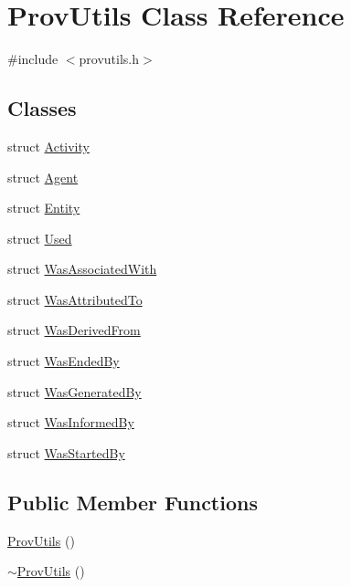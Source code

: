 \hypertarget{class_prov_utils}{\section{Prov\-Utils Class Reference}
\label{class_prov_utils}
}


{\ttfamily \#include $<$provutils.\-h$>$}

\subsection*{Classes}
\begin{DoxyCompactItemize}
\item 
struct \hyperlink{struct_prov_utils_1_1_activity}{Activity}
\item 
struct \hyperlink{struct_prov_utils_1_1_agent}{Agent}
\item 
struct \hyperlink{struct_prov_utils_1_1_entity}{Entity}
\item 
struct \hyperlink{struct_prov_utils_1_1_used}{Used}
\item 
struct \hyperlink{struct_prov_utils_1_1_was_associated_with}{Was\-Associated\-With}
\item 
struct \hyperlink{struct_prov_utils_1_1_was_attributed_to}{Was\-Attributed\-To}
\item 
struct \hyperlink{struct_prov_utils_1_1_was_derived_from}{Was\-Derived\-From}
\item 
struct \hyperlink{struct_prov_utils_1_1_was_ended_by}{Was\-Ended\-By}
\item 
struct \hyperlink{struct_prov_utils_1_1_was_generated_by}{Was\-Generated\-By}
\item 
struct \hyperlink{struct_prov_utils_1_1_was_informed_by}{Was\-Informed\-By}
\item 
struct \hyperlink{struct_prov_utils_1_1_was_started_by}{Was\-Started\-By}
\end{DoxyCompactItemize}
\subsection*{Public Member Functions}
\begin{DoxyCompactItemize}
\item 
\hyperlink{class_prov_utils_a1c050ce900080f4b2bf9731b7799c025}{Prov\-Utils} ()
\item 
\hyperlink{class_prov_utils_aef1d5cc117ebf195fc29cb85719ec0f0}{$\sim$\-Prov\-Utils} ()
\end{DoxyCompactItemize}


